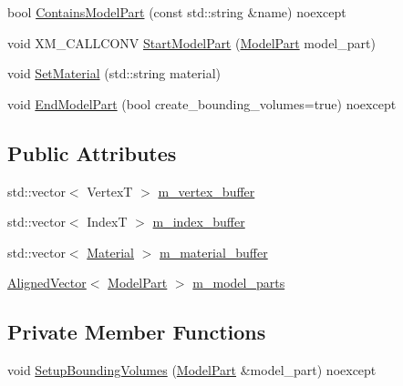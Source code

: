 \begin{DoxyCompactItemize}
\item 
bool \mbox{\hyperlink{structmage_1_1rendering_1_1_model_output_a8382df11416d7233682d2ca53af36d46}{Contains\+Model\+Part}} (const std\+::string \&name) noexcept
\item 
void X\+M\+\_\+\+C\+A\+L\+L\+C\+O\+NV \mbox{\hyperlink{structmage_1_1rendering_1_1_model_output_adc21b44bf476fa7704f97403c1539eb9}{Start\+Model\+Part}} (\mbox{\hyperlink{structmage_1_1rendering_1_1_model_part}{Model\+Part}} model\+\_\+part)
\item 
void \mbox{\hyperlink{structmage_1_1rendering_1_1_model_output_a7c427529a75723fbcc213e64b3ac9b18}{Set\+Material}} (std\+::string material)
\item 
void \mbox{\hyperlink{structmage_1_1rendering_1_1_model_output_ad8f2948cb3ac35f3f25ed68fede20bce}{End\+Model\+Part}} (bool create\+\_\+bounding\+\_\+volumes=true) noexcept
\end{DoxyCompactItemize}
\subsection*{Public Attributes}
\begin{DoxyCompactItemize}
\item 
std\+::vector$<$ VertexT $>$ \mbox{\hyperlink{structmage_1_1rendering_1_1_model_output_a397e9daee731bb89683daa68bd4acd0f}{m\+\_\+vertex\+\_\+buffer}}
\item 
std\+::vector$<$ IndexT $>$ \mbox{\hyperlink{structmage_1_1rendering_1_1_model_output_a0290ea3f7afa5022cedbc9bc316d24e0}{m\+\_\+index\+\_\+buffer}}
\item 
std\+::vector$<$ \mbox{\hyperlink{classmage_1_1rendering_1_1_material}{Material}} $>$ \mbox{\hyperlink{structmage_1_1rendering_1_1_model_output_a7d290dd28d6cef9f33eead6cf30f042f}{m\+\_\+material\+\_\+buffer}}
\item 
\mbox{\hyperlink{namespacemage_a8664bfb5ce2179fc64eae9f82c8a5ba8}{Aligned\+Vector}}$<$ \mbox{\hyperlink{structmage_1_1rendering_1_1_model_part}{Model\+Part}} $>$ \mbox{\hyperlink{structmage_1_1rendering_1_1_model_output_a18da9c959800d0331488351612e25df2}{m\+\_\+model\+\_\+parts}}
\end{DoxyCompactItemize}
\subsection*{Private Member Functions}
\begin{DoxyCompactItemize}
\item 
void \mbox{\hyperlink{structmage_1_1rendering_1_1_model_output_a4b00228713e34d955cb5104c8592f7a0}{Setup\+Bounding\+Volumes}} (\mbox{\hyperlink{structmage_1_1rendering_1_1_model_part}{Model\+Part}} \&model\+\_\+part) noexcept
\end{DoxyCompactItemize}


